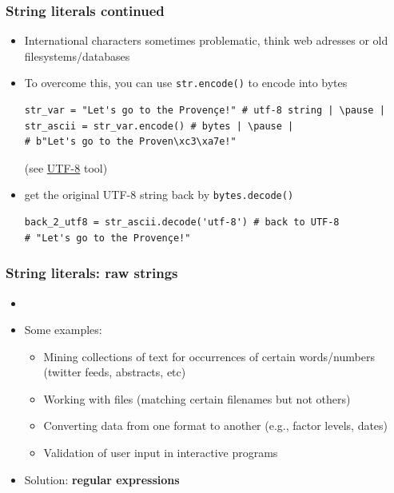 \documentclass[xcolor=table]{beamer}
\begin{document}
\begin{frame}[fragile]
    \frametitle{String literals continued}
\begin{itemize}
    \item International characters sometimes problematic, think web adresses or old filesystems/databases
        \pause
    \item To overcome this, you can use \texttt{str.encode()} to encode into bytes
\begin{lstlisting}[style=python,belowskip=-1.5\baselineskip]
str_var = "Let's go to the Provençe!" # utf-8 string | \pause |
str_ascii = str_var.encode() # bytes | \pause |
# b"Let's go to the Proven\xc3\xa7e!"
\end{lstlisting} (see \href{http://www.ltg.ed.ac.uk/~richard/utf-8.cgi}{UTF-8} tool) 
\pause
    \item get the original UTF-8 string back by \texttt{bytes.decode()}
        \pause
\begin{lstlisting}[style=python]
back_2_utf8 = str_ascii.decode('utf-8') # back to UTF-8
# "Let's go to the Provençe!"
\end{lstlisting}
\end{itemize}
\end{frame}

\begin{frame}[fragile]
    \frametitle{String literals: raw strings}
\begin{itemize}
	\item 



	\item<2-> Some examples:
        \begin{itemize}\addtolength{\itemsep}{.25\baselineskip}
            \item<3-> Mining collections of text for occurrences of certain words/numbers (twitter feeds, abstracts, etc)
            \item<4-> Working with files (matching certain filenames but not others) 
            \item<5-> Converting data from one format to another (e.g., factor levels, dates)
            \item<6-> Validation of user input in interactive programs
        \end{itemize}
    \item<7-> Solution: \textbf{regular expressions}
\end{itemize}

\end{frame}
\end{document}
